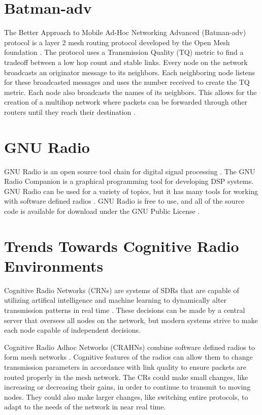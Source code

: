 \section{Batman-adv}

The Better Approach to Mobile Ad-Hoc Networking Advanced (Batman-adv) protocol is a layer 2 mesh routing protocol developed by the Open Mesh foundation \cite{0032}. The protocol uses a Transmission Quality (TQ) metric to find a tradeoff between a low hop count and stable links. Every node on the network broadcasts an originator message to its neighbors. Each neighboring node listens for these broadcasted messages and uses the number received to create the TQ metric. Each node also broadcasts the names of its neighbors. This allows for the creation of a multihop network where packets can be forwarded through other routers until they reach their destination \cite{6115569}. 

\section{GNU Radio}

GNU Radio is an open source tool chain for digital signal processing \cite{7043470} . The GNU Radio Companion is a graphical programming tool for developing DSP systems. GNU Radio can be used for a variety of topics, but it has many tools for working with software defined radios \cite{7430125}. GNU Radio is free to use, and all of the source code is available for download under the GNU Public License \cite{6081528}. 
 

\section{Trends Towards Cognitive Radio Environments}

Cognitive Radio Networks (CRNs) are systems of SDRs that are capable of utilizing artifical intelligence and machine learning to dynamically alter transmission patterns in real time \cite{Akyildiz2007921}. These decisions can be made by a central server that oversees all nodes on the network, but modern systems strive to make each node capable of independent decisions. 

Cognitive Radio Adhoc Networks (CRAHNs) combine software defined radios to form mesh networks \cite{Akyildiz2009810}. Cognitive features of the radios can allow them to change transmission parameters in accordance with link quality to ensure packets are routed properly in the mesh network. The CRs could make small changes, like increasing or decreasing their gains, in order to continue to transmit to moving nodes. They could also make larger changes, like switching entire protocols, to adapt to the needs of the network in near real time. 

